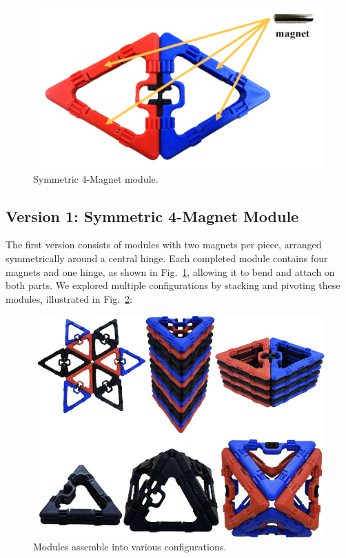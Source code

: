 \documentclass[lettersize,journal]{IEEEtran}
\begin{document}
\begin{figure}[H]
    \centering
    \includegraphics[width=0.5\linewidth]{version1module.png}
    \caption{Symmetric 4-Magnet module.}
    \label{fig:version1}
\end{figure}

\subsection{Version 1: Symmetric 4-Magnet Module}
The first version consists of modules with two magnets per piece, arranged symmetrically around a central hinge. Each completed module contains four magnets and one hinge, as shown in Fig.~\ref{fig:version1}, allowing it to bend and attach on both parts. We explored multiple configurations by stacking and pivoting these modules, illustrated in Fig.~\ref{fig:Modules Assemble into Various Structures}:
\begin{figure}[H]
    \centering
    \includegraphics[width=0.8\linewidth]{Modules Assemble into Various Structures.png}
    \caption{Modules assemble into various configurations.}
    \label{fig:Modules Assemble into Various Structures}
\end{figure}
\end{document}

